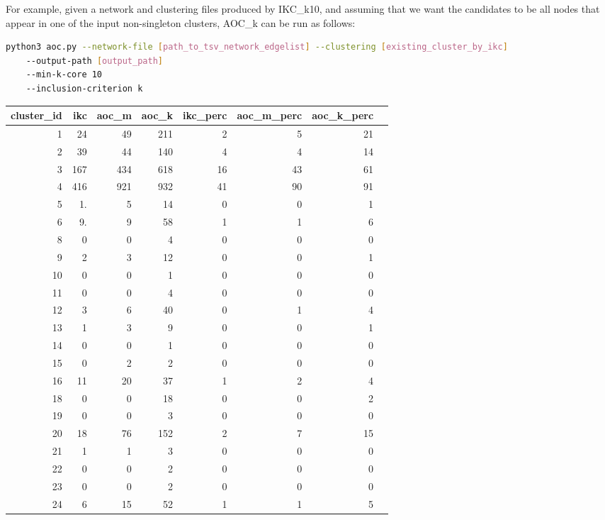 \documentclass[12pt, oneside]{article}   	%
\begin{document}
For example, given a network and clustering files produced by IKC\_k10, and assuming
that we want the candidates to be all nodes that appear in one of the input non-singleton clusters, AOC\_k can be run as follows:
\begin{lstlisting}[language=bash]
python3 aoc.py --network-file [path_to_tsv_network_edgelist] --clustering [existing_cluster_by_ikc]
    --output-path [output_path]
    --min-k-core 10
    --inclusion-criterion k
\end{lstlisting}


\begin{table}[ht]
\centering
\begin{tabular}{rrrrrrrr}
  \hline
cluster\_id & ikc & aoc\_m & aoc\_k & ikc\_perc & aoc\_m\_perc & aoc\_k\_perc \\ 
  \hline
1 & 24 &  49 & 211 &   2 &   5 &  21 \\ 
2 & 39 &  44 & 140 &   4 &   4 &  14 \\ 
3 & 167 & 434 & 618 &  16 &  43 &  61 \\ 
4 & 416 & 921 & 932 &  41 &  90 &  91 \\ 
5 & 1. &   5 &  14 &   0 &   0 &   1 \\ 
6 & 9. &   9 &  58 &   1 &   1 &   6 \\ 
8 & 0 &   0 &   4 &   0 &   0 &   0 \\ 
9 & 2 &   3 &  12 &   0 &   0 &   1 \\ 
10 & 0 &   0 &   1 &   0 &   0 &   0 \\ 
11 & 0 &   0 &   4 &   0 &   0 &   0 \\ 
12 & 3 &   6 &  40 &   0 &   1 &   4 \\ 
13 & 1 &   3 &   9 &   0 &   0 &   1 \\ 
14 & 0 &   0 &   1 &   0 &   0 &   0 \\ 
15 & 0 &   2 &   2 &   0 &   0 &   0 \\ 
16 & 11 &  20 &  37 &   1 &   2 &   4 \\ 
18 & 0 &   0 &  18 &   0 &   0 &   2 \\ 
19 & 0 &   0 &   3 &   0 &   0 &   0 \\ 
20 & 18 &  76 & 152 &   2 &   7 &  15 \\ 
21 & 1 &   1 &   3 &   0 &   0 &   0 \\ 
22 & 0 &   0 &   2 &   0 &   0 &   0 \\ 
23 & 0 &   0 &   2 &   0 &   0 &   0 \\ 
24 & 6 &  15 &  52 &   1 &   1 &   5 \\ 

\end{tabular}
\end{table}
\end{document}
